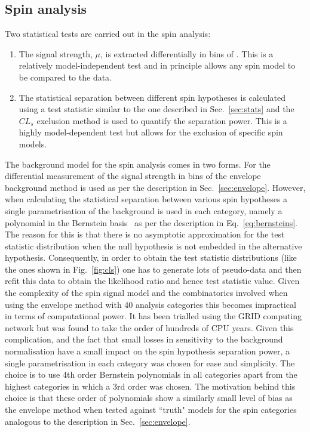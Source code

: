 \subsection{Spin analysis}

Two statistical tests are carried out in the spin analysis:

\begin{enumerate}
  \item The signal strength, $\mu$, is extracted differentially in bins of \abscostheta. This is a relatively model-independent test and in principle allows any spin model to be compared to the data.
  \item The statistical separation between different spin hypotheses is calculated using a test statistic similar to the one described in Sec.~\ref{sec:stats} and the $CL_{s}$ exclusion method is used to quantify the separation power. This is a highly model-dependent test but allows for the exclusion of specific spin models.
\end{enumerate}

The background model for the spin analysis comes in two forms. For the differential measurement of the signal strength in bins of \abscostheta the envelope background method is used as per the description in Sec.~\ref{sec:envelope}. However, when calculating the statistical separation between various spin hypotheses a single parametrisation of the background is used in each category, namely a polynomial in the Bernstein basis~\cite{bernsteins1,bernsteins2} as per the description in Eq.~\ref{eq:bernsteins}. The reason for this is that there is no asymptotic approximation for the test statistic distribution when the null hypothesis is not embedded in the alternative hypothesis. Consequently, in order to obtain the test statistic distributions (like the ones shown in Fig.~\ref{fig:cls}) one has to generate lots of pseudo-data and then refit this data to obtain the likelihood ratio and hence test statistic value. Given the complexity of the spin signal model and the combinatorics involved when using the envelope method with 40 analysis categories this becomes impractical in terms of computational power. It has been trialled using the GRID computing network but was found to take the order of hundreds of CPU years.
Given this complication, and the fact that small losses in sensitivity to the background normalisation have a small impact on the spin hypothesis separation power, a single parametrisation in each category was chosen for ease and simplicity. The choice is to use 4th order Bernstein polynomials in all categories apart from the highest \abscostheta categories in which a 3rd order was chosen. The motivation behind this choice is that these order of polynomials show a similarly small level of bias as the envelope method when tested against ``truth" models for the spin categories analogous to the description in Sec.~\ref{sec:envelope}.


